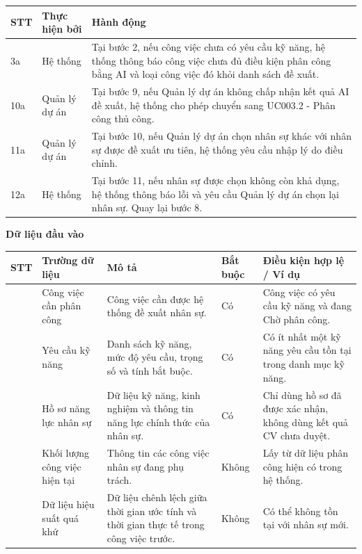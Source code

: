 \documentclass[../DoAn.tex]{subfiles}
\begin{document}
{\ucTableText
\begin{longtable}{|>{\centering\arraybackslash}p{}|p{}|p{}|}
\hline
\rowcolor{ucHeaderBg}\textbf{STT} & \textbf{Thực hiện bởi} & \textbf{Hành động} \\ \hline
3a & Hệ thống & Tại bước 2, nếu công việc chưa có yêu cầu kỹ năng, hệ thống thông báo công việc chưa đủ điều kiện phân công bằng AI và loại công việc đó khỏi danh sách đề xuất. \\ \hline
10a & Quản lý dự án & Tại bước 9, nếu Quản lý dự án không chấp nhận kết quả AI đề xuất, hệ thống cho phép chuyển sang UC003.2 - Phân công thủ công. \\ \hline
11a & Quản lý dự án & Tại bước 10, nếu Quản lý dự án chọn nhân sự khác với nhân sự được đề xuất ưu tiên, hệ thống yêu cầu nhập lý do điều chỉnh. \\ \hline
12a & Hệ thống & Tại bước 11, nếu nhân sự được chọn không còn khả dụng, hệ thống thông báo lỗi và yêu cầu Quản lý dự án chọn lại nhân sự. Quay lại bước 8. \\ \hline
\end{longtable}
}

\textbf{Dữ liệu đầu vào}

{\ucDataText
\begin{longtable}{|>{\centering\arraybackslash}p{}|>{\raggedright\arraybackslash}p{}|>{\raggedright\arraybackslash}p{}|>{\raggedright\arraybackslash}p{}|>{\raggedright\arraybackslash}p{}|}
\hline
\rowcolor{ucHeaderBg}\textbf{STT} & \textbf{Trường dữ liệu} & \textbf{Mô tả} & \textbf{Bắt buộc} & \textbf{Điều kiện hợp lệ / Ví dụ} \\ \hline
1 & Công việc cần phân công & Công việc cần được hệ thống đề xuất nhân sự. & Có & Công việc có yêu cầu kỹ năng và đang Chờ phân công. \\ \hline
2 & Yêu cầu kỹ năng & Danh sách kỹ năng, mức độ yêu cầu, trọng số và tính bắt buộc. & Có & Có ít nhất một kỹ năng yêu cầu tồn tại trong danh mục kỹ năng. \\ \hline
3 & Hồ sơ năng lực nhân sự & Dữ liệu kỹ năng, kinh nghiệm và thông tin năng lực chính thức của nhân sự. & Có & Chỉ dùng hồ sơ đã được xác nhận, không dùng kết quả CV chưa duyệt. \\ \hline
4 & Khối lượng công việc hiện tại & Thông tin các công việc nhân sự đang phụ trách. & Không & Lấy từ dữ liệu phân công hiện có trong hệ thống. \\ \hline
5 & Dữ liệu hiệu suất quá khứ & Dữ liệu chênh lệch giữa thời gian ước tính và thời gian thực tế trong công việc trước. & Không & Có thể không tồn tại với nhân sự mới. \\ \hline
\end{longtable}
}
\end{document}
